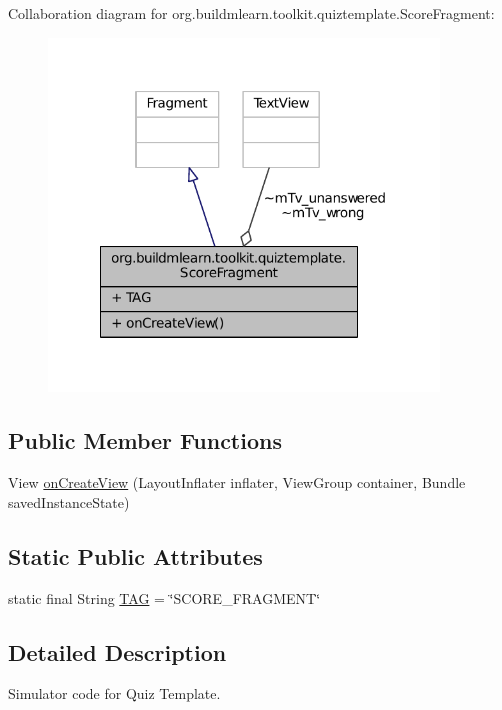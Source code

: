 Collaboration diagram for org.\-buildmlearn.\-toolkit.\-quiztemplate.\-Score\-Fragment\-:
\nopagebreak
\begin{figure}[H]
\begin{center}
\leavevmode
\includegraphics[width=294pt]{d0/d23/classorg_1_1buildmlearn_1_1toolkit_1_1quiztemplate_1_1ScoreFragment__coll__graph}
\end{center}
\end{figure}
\subsection*{Public Member Functions}
\begin{DoxyCompactItemize}
\item 
View \hyperlink{classorg_1_1buildmlearn_1_1toolkit_1_1quiztemplate_1_1ScoreFragment_a2a08483650f2c8f0e1c8ac8a25b10b75}{on\-Create\-View} (Layout\-Inflater inflater, View\-Group container, Bundle saved\-Instance\-State)
\end{DoxyCompactItemize}
\subsection*{Static Public Attributes}
\begin{DoxyCompactItemize}
\item 
static final String \hyperlink{classorg_1_1buildmlearn_1_1toolkit_1_1quiztemplate_1_1ScoreFragment_a0f33e1b8e2e8d4acddb6e2932dbd65ed}{T\-A\-G} = \char`\"{}S\-C\-O\-R\-E\-\_\-\-F\-R\-A\-G\-M\-E\-N\-T\char`\"{}
\end{DoxyCompactItemize}


\subsection{Detailed Description}
Simulator code for Quiz Template. 

